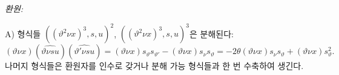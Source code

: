 
\noindent\emph{환원:}

A) 형식들 $((\vartheta^2\nu x)^3,s,u)^2$, $((\vartheta^2\nu x)^3,s,u)^3$은 분해된다:
\[
(\vartheta \nu x)(\widehat{\vartheta \nu su})(\widehat{\vartheta'\nu su})
=(\vartheta \nu x)s_\vartheta s_{\vartheta'}-(\vartheta \nu x)s_\nu s_\vartheta
=-2\theta(\vartheta \nu x)s_\nu s_\vartheta+(\vartheta \nu x)s_\vartheta^2.
\]
나머지 형식들은 환원자를 인수로 갖거나 분해 가능 형식들과 한 번 수축하여 생긴다.

